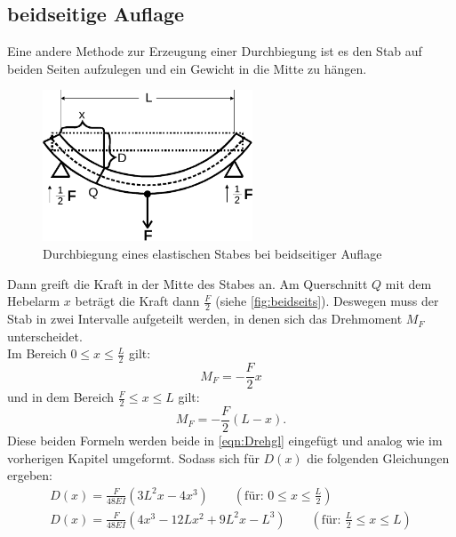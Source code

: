 \subsection{beidseitige Auflage}

Eine andere Methode zur Erzeugung einer Durchbiegung ist es den Stab auf beiden Seiten aufzulegen und ein Gewicht in die Mitte zu hängen.
\begin{figure}[H]
  \centering
  \includegraphics[height=4.5cm]{content/beidseits.pdf}
  \caption{Durchbiegung eines elastischen Stabes bei beidseitiger Auflage\cite[110]{V103}}
  \label{fig:beidseits}
\end{figure}
Dann greift die Kraft in der Mitte des Stabes an.
Am Querschnitt $Q$ mit dem Hebelarm $x$ beträgt die Kraft dann $\frac{F}{2}$ (siehe \autoref{fig:beidseits}). 
Deswegen muss der Stab in zwei Intervalle aufgeteilt werden, in denen sich das Drehmoment $M_F$ unterscheidet.\\
Im Bereich $ 0 \leq x \leq \frac{L}{2}$ gilt:
\begin{equation}
  M_F = -\frac{F}{2}x
  \label{eqn:M_F1}
\end{equation}
und in dem Bereich $\frac{F}{2} \leq x \leq L$ gilt:
\begin{equation}
  M_F = -\frac{F}{2}(L-x).
  \label{eqn:M_F2}
\end{equation}
Diese beiden Formeln werden beide in \autoref{eqn:Drehgl} eingefügt und analog wie im vorherigen Kapitel umgeformt.
Sodass sich für $D(x)$ die folgenden Gleichungen ergeben:
\begin{align}
   D(x) = \frac{F}{48EI}(3L^2x - 4x^3) \qquad (\text{für: } 0 \leq x \leq \frac{L}{2})\label{eqn:Biegungbl}\\
   D(x) = \frac{F}{48EI}(4x^3 - 12Lx^2 + 9L^2x -L^3) \qquad (\text{für: } \frac{L}{2} \leq x \leq L)\label{eqn:Biegungbr}
\end{align}







